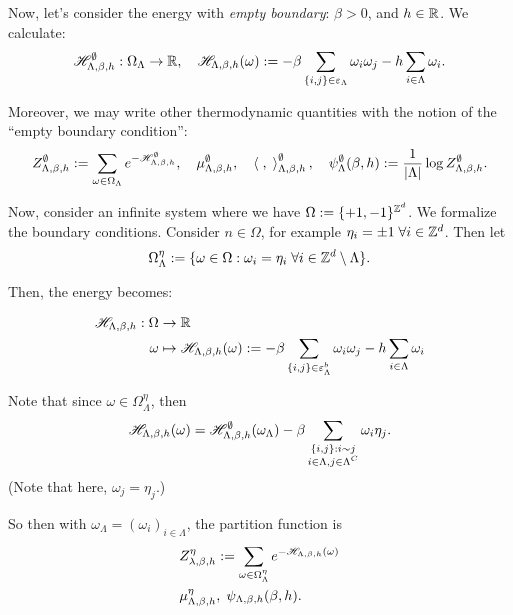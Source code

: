 \documentclass{article}
\begin{document}
Now, let's consider the energy with \textit{empty boundary}: $\beta > 0$, and $h \in \mathbb{R}$. We calculate: 
\begin{align}
\label{eq:4}
  \mathscr{H}_{\Lambda, \beta, h}^{\emptyset} : \Omega_{\Lambda} \rightarrow \mathbb{R}, \quad \mathscr{H}_{\Lambda, \beta, h}(\omega) := - \beta \sum\limits_{\{ i, j \} \in \varepsilon_{\Lambda}} \omega_i \omega_j - h \sum\limits_{i \in \Lambda} \omega_i.
\end{align}

Moreover, we may write other thermodynamic quantities with the notion of the ``empty boundary condition'': 
\begin{align}
\label{eq:5}
  Z_{\Lambda, \beta, h}^{\emptyset} := \sum\limits_{\omega\in\Omega_{\Lambda}} e^{-\mathscr{H}_{\Lambda, \beta, h}^{\emptyset}}, \quad \mu_{\Lambda, \beta, h}^{\emptyset}, \quad \left\langle \; , \;  \right\rangle_{\Lambda, \beta, h}^{\emptyset}, \quad \psi_{\Lambda}^{\emptyset}(\beta, h) := \frac{1}{\left| \Lambda \right|} \log Z_{\Lambda, \beta, h}^{\emptyset}.
\end{align}

Now, consider an infinite system where we have $\Omega := \{ +1, -1 \}^{\mathbb{Z}^{d}}$. We formalize the boundary conditions. Consider $n \in \Omega$, for example $\eta_i = \pm 1 \; \forall i \in \mathbb{Z}^d$. Then let
\begin{equation}
  \Omega_{\Lambda}^{\eta} := \{ \omega \in \Omega : \omega_i = \eta_i \; \forall i \in \mathbb{Z}^d \setminus \Lambda \}. 
\end{equation}

Then, the energy becomes:

\begin{align}
  \mathscr{H}_{\Lambda, \beta, h} : \Omega &\rightarrow \mathbb{R} \\
  \omega &\mapsto \mathscr{H}_{\Lambda, \beta, h}(\omega) := - \beta \sum\limits_{\{ i, j \} \in \varepsilon_{\Lambda}^{b}} \omega_i \omega_j - h \sum\limits_{i \in  \Lambda} \omega_i
\end{align}

Note that since $\omega \in \Omega_{\Lambda}^{\eta}$, then
\begin{equation}
  \mathscr{H}_{\Lambda, \beta, h}(\omega) = \mathscr{H}_{\Lambda, \beta, h}^{\emptyset}(\omega_{\Lambda}) - \beta \sum\limits_{\substack{\{ i, j \} : i \sim j \\ i \in \Lambda, j \in \Lambda^C}} \omega_i \eta_j.
\end{equation}
(Note that here, $\omega_j = \eta_j$.)

So then with $\omega_{\Lambda} = (\omega_i)_{i \in \Lambda}$, the partition function is 
\begin{align}
\label{eq:7}
  Z_{\lambda, \beta, h}^{\eta} &:= \sum\limits_{\omega \in \Omega_{\Lambda}^{\eta}} e^{-\mathscr{H}_{\Lambda, \beta, h}(\omega)} \\
  \mu_{\Lambda, \beta, h}^{\eta} &, \; \psi_{\Lambda, \beta, h}(\beta, h).
\end{align}
\end{document}
